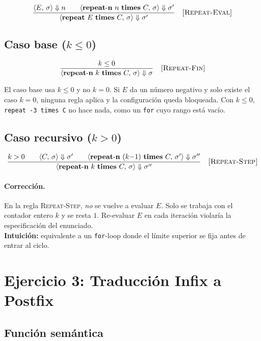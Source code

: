 \documentclass[11pt]{article}
\begin{document}
\[
  \frac{
    \langle E,\, \sigma \rangle \Downarrow n
    \qquad
    \langle \mathbf{repeat\text{-}n}\ n\ \mathbf{times}\ C,\,
            \sigma \rangle \Downarrow \sigma'
  }{
    \langle \mathbf{repeat}\ E\ \mathbf{times}\ C,\,
            \sigma \rangle \Downarrow \sigma'
  }
  \quad \textsc{[Repeat-Eval]}
\]

\subsection*{Caso base ($k \le 0$)}

\[
  \frac{k \le 0}{
    \langle \mathbf{repeat\text{-}n}\ k\ \mathbf{times}\ C,\,
            \sigma \rangle \Downarrow \sigma
  }
  \quad \textsc{[Repeat-Fin]}
\]

El caso base usa $k \le 0$ y no $k = 0$. Si $E$ da un número negativo y solo
existe el caso $k = 0$, ninguna regla aplica y la configuración queda
bloqueada. Con $k \le 0$, \texttt{repeat -3 times C} no hace nada, como un
\texttt{for} cuyo rango está vacío.

\subsection*{Caso recursivo ($k > 0$)}


\[
  \frac{
    k > 0
    \qquad
    \langle C,\, \sigma \rangle \Downarrow \sigma'
    \qquad
    \langle \mathbf{repeat\text{-}n}\ (k{-}1)\ \mathbf{times}\ C,\,
            \sigma' \rangle \Downarrow \sigma''
  }{
    \langle \mathbf{repeat\text{-}n}\ k\ \mathbf{times}\ C,\,
            \sigma \rangle \Downarrow \sigma''
  }
  \quad \textsc{[Repeat-Step]}
\]

\paragraph{Corrección.} En la regla \textsc{Repeat-Step},
  \emph{no} se vuelve a evaluar $E$.
  Solo se trabaja con el contador entero $k$ y se resta $1$.
  Re-evaluar $E$ en cada iteración violaría la especificación del enunciado.\\[4pt]
  \textbf{Intuición:} equivalente a un \texttt{for}-loop donde el límite
  superior se fija antes de entrar al ciclo.


\section{Ejercicio 3: Traducción Infix a Postfix}


\subsection*{Función semántica}
\end{document}
